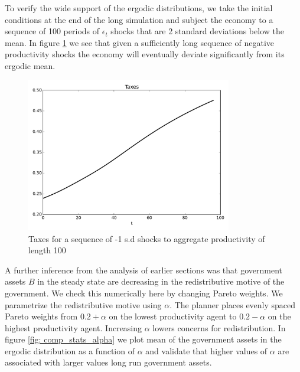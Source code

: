 \documentclass[thmsb,11pt]{article}
\begin{document}
To verify the wide support of the ergodic distributions,
we take the initial conditions at the end of the long simulation and subject the economy to a sequence of 100 periods of $\epsilon_t$ shocks that  are 2 standard deviations below the mean.  In figure \ref{fig: wide support of taxes} we see that given a sufficiently long sequence of negative productivity  shocks the economy will eventually deviate significantly from its ergodic mean.


{
  \begin{figure}
  \label{fig: wide support of taxes}
    \centering
    \includegraphics[width = 0.8\textwidth]{cesplots/taxes_only_bad_shocks.png}
    \caption{Taxes for a sequence of -1 s.d shocks to aggregate productivity of length 100}
  \end{figure}

}

A further inference from the analysis of earlier sections was that government assets $B$  in the steady state are decreasing in the redistributive motive of the government.
We check this numerically here  by changing  Pareto weights.
We parametrize the redistributive motive using  $\alpha$.  The planner places evenly spaced Pareto weights from $0.2+\alpha$
on the lowest productivity agent to $0.2-\alpha$ on the highest productivity agent. Increasing $\alpha$ lowers concerns for redistribution.
In figure \ref{fig: comp_stats_alpha} we plot mean of the government assets in the ergodic distribution as a function of $\alpha$ and validate that higher values of $\alpha$ are associated with larger values long run government assets.
\end{document}
